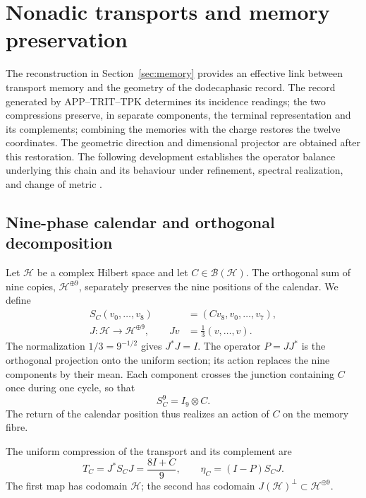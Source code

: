 \section{Nonadic transports and memory preservation}
\label{sec:nonadic}

The reconstruction in Section~\ref{sec:memory} provides an
effective link between transport memory and the geometry of the
dodecaphasic record. The record generated by APP--TRIT--TPK determines its
incidence readings; the two compressions preserve, in separate
components, the terminal representation and its complements; combining
the memories with the charge restores the twelve coordinates. The geometric
direction and dimensional projector are obtained after this
restoration. The following development establishes the operator balance
underlying this chain and its behaviour under refinement,
spectral realization, and change of metric
\cite{HMT-VIII,hmtX}.

\subsection{Nine-phase calendar and orthogonal decomposition}

Let \(\mathcal H\) be a complex Hilbert space and let
\(C\in\mathcal B(\mathcal H)\). The orthogonal sum of nine copies,
\(\mathcal H^{\oplus9}\), separately preserves the nine positions
of the calendar. We define
\begin{equation}
 \begin{split}
 S_C(v_0,\ldots,v_8)&=(Cv_8,v_0,\ldots,v_7),\\
 J:\mathcal H\longrightarrow\mathcal H^{\oplus9},
 \qquad Jv&=\frac13(v,\ldots,v).
 \end{split}
 \label{nt:calendar}
\end{equation}
The normalization \(1/3=9^{-1/2}\) gives \(J^*J=I\). The operator
\(P=JJ^*\) is the orthogonal projection onto the uniform section;
its action replaces the nine components by their mean. Each
component crosses the junction containing \(C\) once during one
cycle, so that
\begin{equation}
 S_C^9=I_9\otimes C.
 \label{nt:full-return}
\end{equation}
The return of the calendar position thus realizes an action of
\(C\) on the memory fibre.

\begin{definition}
The uniform compression of the transport and its complement are
\begin{equation}
 T_C=J^*S_CJ=\frac{8I+C}{9},
 \qquad
 \eta_C=(I-P)S_CJ.
 \label{nt:compression}
\end{equation}
The first map has codomain \(\mathcal H\); the second
has codomain \(J(\mathcal H)^\perp\subset\mathcal H^{\oplus9}\).
\end{definition}

